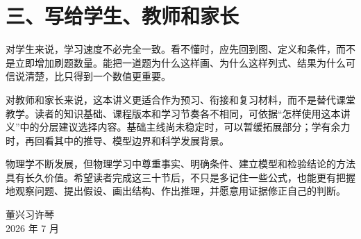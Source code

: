 \section*{三、写给学生、教师和家长}

对学生来说，学习速度不必完全一致。看不懂时，应先回到图、定义和条件，而不是立即增加刷题数量。能把一道题为什么这样画、为什么这样列式、结果为什么可信说清楚，比只得到一个数值更重要。

对教师和家长来说，这本讲义更适合作为预习、衔接和复习材料，而不是替代课堂教学。读者的知识基础、课程版本和学习节奏各不相同，可依据“怎样使用这本讲义”中的分层建议选择内容。基础主线尚未稳定时，可以暂缓拓展部分；学有余力时，再回看其中的推导、模型边界和科学发展背景。

物理学不断发展，但物理学习中尊重事实、明确条件、建立模型和检验结论的方法具有长久价值。希望读者完成这三十节后，不只是多记住一些公式，也能更有把握地观察问题、提出假设、画出结构、作出推理，并愿意用证据修正自己的判断。

\begin{flushright}
董兴习\quad 许琴\\
2026 年 7 月
\end{flushright}
